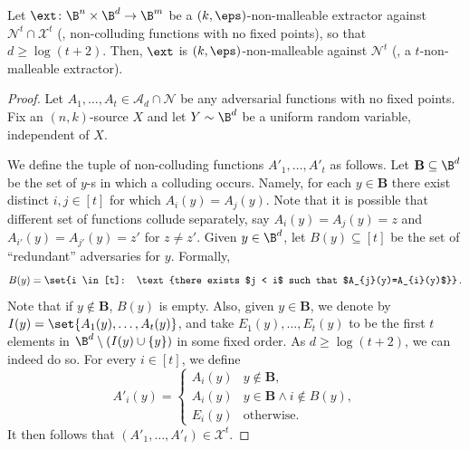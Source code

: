\begin{lemma}\label{lem:nm-with-coll} 
Let $\ext \colon \B^{n} \times \B^{d} \rightarrow \B^{m}$ be a $(k,\eps)$-non-malleable
extractor against $\mathcal{N}^{t} \cap \mathcal{X}^{t}$ (\ie, non-colluding functions
with no fixed points), so that $d \ge \log (t + 2)$. Then, $\ext$ is $(k,\eps)$-non-malleable
against $\mathcal{N}^{t}$ (\ie, a $t$-non-malleable extractor).
\end{lemma}
\begin{proof}
Let $A_1,\ldots,A_t \in \mathcal{A}_d \cap \mathcal{N}$ be any adversarial
functions with no fixed points. 
Fix an $(n,k)$-source $X$ and let $Y \sim \B^d$ be a uniform random variable,
independent of $X$.

We define the tuple of non-colluding functions
$A'_1,\ldots,A'_t$ as follows. Let $\mathbf{B} \subseteq \B^d$ be the set of $y$-s 
in which a colluding occurs. Namely, for each $y \in \mathbf{B}$ there exist distinct $i,j \in [t]$
for which $A_{i}(y)=A_{j}(y)$. Note that it is possible that different set of functions collude
separately, say $A_{i}(y)=A_{j}(y) = z$ and $A_{i'}(y)=A_{j'}(y) = z'$ for $z \neq z'$.
Given $y \in \B^d$, let $B(y) \subseteq [t]$ be the set of ``redundant'' 
adversaries for $y$. Formally, 
\[
B(y) = \set{i \in [t]: \text{there exists $j < i$ such that $A_{j}(y)=A_{i}(y)$}}\,.
\]
Note that if $y \notin \mathbf{B}$, $B(y)$ is empty. 
Also, given $y \in \mathbf{B}$, we denote by $I(y) = \set{A_{1}(y),\ldots,A_{t}(y)}$, and
take $E_1(y),\ldots,E_{t}(y)$ to be the first $t$ elements in $\B^{d} \setminus (I(y) \cup \{y\})$ in some fixed order.  
As $d \ge \log( t + 2)$, we can indeed do so. For every $i \in [t]$, we define
\[
A'_{i}(y) = 
\begin{cases}
A_{i}(y) & y \notin \mathbf{B}, \\
A_{i}(y) & y \in \mathbf{B} \wedge i \notin B(y), \\
E_{i}(y) & \text{otherwise}.
\end{cases}
\]
It then follows that $\left( A'_1,\ldots,A'_t \right) \in \mathcal{X}^t$. 


\end{proof}
